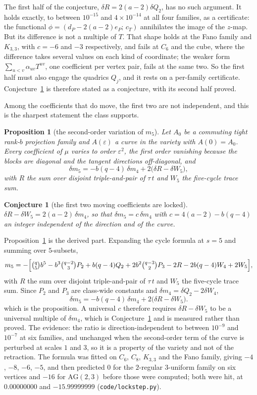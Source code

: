 \documentclass[11pt]{article}
\newtheorem{conjecture}[theorem]{Conjecture}
\newtheorem{proposition}[theorem]{Proposition}
\theoremstyle{remark}
\begin{document}
The first half of the conjecture, $\delta R=2(a-2)\delta Q_2$, has no such argument. It holds exactly,
to between $10^{-15}$ and $4\times10^{-14}$ at all four families, as a certificate: the functional
$\phi=(d_P-2(a-2)e_P;\,c_T)$ annihilates the image of the $z$-map. But its difference is not a
multiple of $T$. That shape holds at the Fano family and $K_{3,3}$, with $c=-6$ and $-3$ respectively,
and fails at $C_6$ and the cube, where the difference takes several values on each kind of coordinate;
the weaker form $\sum_{u<v}\alpha_{uv}T^{uv}$, one coefficient per vertex pair, fails at the same two.
So the first half must also engage the quadrics $Q_j$, and it rests on a per-family certificate.
Conjecture~\ref{conj:lockstep} is therefore stated as a conjecture, with its second half proved.

Among the coefficients that do move, the first two are not independent, and this is the sharpest
statement the class supports.

\begin{proposition}[the second-order variation of $m_5$]\label{prop:lockstep}
Let $A_0$ be a commuting tight rank-$b$ projection family and $A(\varepsilon)$ a curve in the variety
with $A(0)=A_0$. Every coefficient of $\mu$ varies to order $\varepsilon^2$, the first order
vanishing because the blocks are diagonal and the tangent directions off-diagonal, and
\[
\delta m_5=-b(q-4)\,\delta m_4+2\bigl(\delta R-\delta W_5\bigr),
\]
with $R$ the sum over disjoint triple-and-pair of $\tau\,t$ and $W_5$ the five-cycle trace sum.
\end{proposition}

\begin{conjecture}[the first two moving coefficients are locked]\label{conj:lockstep}
$\delta R-\delta W_5=2(a-2)\,\delta m_4$, so that $\delta m_5=c\,\delta m_4$ with
$c=4(a-2)-b(q-4)$ an integer independent of the direction and of the curve.
\end{conjecture}

Proposition~\ref{prop:lockstep} is the derived part. Expanding the cycle formula at $s=5$ and
summing over $5$-subsets,
\[
m_5=-\Bigl[\tbinom q5b^5-b^3\tbinom{q-2}3P_2+b(q-4)Q_2+2b^2\tbinom{q-3}2P_3-2R-2b(q-4)W_4+2W_5\Bigr],
\]
with $R$ the sum over disjoint triple-and-pair of $\tau\,t$ and $W_5$ the five-cycle trace sum. Since
$P_2$ and $P_3$ are class-wide constants and $\delta m_4=\delta Q_2-2\delta W_4$,
\[
\delta m_5=-b(q-4)\,\delta m_4+2\bigl(\delta R-\delta W_5\bigr).
\]
which is the proposition. A universal $c$ therefore requires $\delta R-\delta W_5$ to be a universal
multiple of $\delta m_4$, which is Conjecture~\ref{conj:lockstep} and is measured rather than proved.
The evidence: the ratio is direction-independent to between $10^{-9}$ and $10^{-7}$ at six
families, and unchanged when the second-order term of the curve is perturbed at scales $1$ and $3$,
so it is a property of the variety and not of the retraction. The formula was fitted on $C_6$, $C_8$,
$K_{3,3}$ and the Fano family, giving $-4$, $-8$, $-6$, $-5$, and then predicted $0$ for the
$2$-regular $3$-uniform family on six vertices and $-16$ for $\mathrm{AG}(2,3)$ before those were
computed; both were hit, at $0.00000000$ and $-15.99999999$ (\texttt{code/lockstep.py}).
\end{document}
